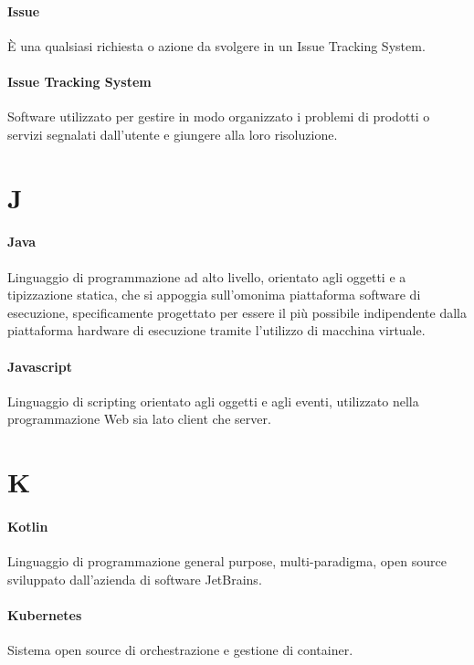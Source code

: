 \documentclass[]{article}
\begin{document}
	\paragraph*{Issue}
	È una qualsiasi richiesta o azione da svolgere in un Issue Tracking System.
		
	\paragraph*{Issue Tracking System}
	Software utilizzato per gestire in modo organizzato i problemi di prodotti o servizi segnalati dall’utente e giungere alla loro risoluzione.
		
	\newpage
	
	\section*{J}
	
	\paragraph*{Java}
	Linguaggio di programmazione ad alto livello, orientato agli oggetti e a tipizzazione statica, che si appoggia sull'omonima piattaforma software di esecuzione, specificamente progettato per essere il più possibile indipendente dalla piattaforma hardware di esecuzione tramite l'utilizzo di macchina virtuale.
	
	\paragraph*{Javascript}
	Linguaggio di scripting orientato agli oggetti e agli eventi, utilizzato nella programmazione Web sia lato client che server.
	
	\newpage
	
	\section*{K}
	
	\paragraph*{Kotlin}
	Linguaggio di programmazione general purpose, multi-paradigma, open source sviluppato dall'azienda di software JetBrains.
	
	\paragraph*{Kubernetes}
	Sistema open source di orchestrazione e gestione di container.
	
\end{document}
